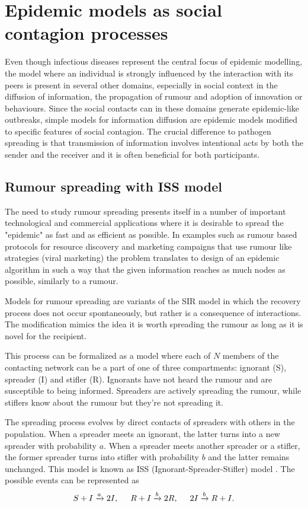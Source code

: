 \documentclass[times, utf8, diplomski]{fer}
\begin{document}
\section{Epidemic models as social contagion processes}
Even though infectious diseases represent the central focus of epidemic modelling, the model where an individual is strongly influenced by the interaction with its peers is present in several other domains, especially in social context in the diffusion of information, the propagation of rumour and adoption of innovation or behaviours.  Since the social contacts can in these domains generate epidemic-like outbreaks, simple models for information diffusion are epidemic models modified to specific features of social contagion. The crucial difference to pathogen spreading is that transmission of information involves intentional acts by both the sender and the receiver and it is often beneficial for both participants.

\subsection{Rumour spreading with ISS model}
The need to study rumour spreading presents itself in a number of important technological and commercial applications where it is desirable to spread the "epidemic" as fast and as efficient as possible.  In examples such as rumour based protocols for resource discovery and marketing campaigns that use rumour like strategies (viral marketing)  the problem translates to design of an epidemic algorithm in such a way that the given information reaches as much nodes as possible, similarly to a rumour.

Models for rumour spreading are variants of the SIR model in which the recovery process does not occur spontaneously, but rather is a consequence of interactions. The modification mimics the idea it is worth spreading the rumour as long as it is novel for the recipient.

 This process can be formalized as a model where each of  $N$ members of the contacting network can be a part of one of three compartments: ignorant (S), spreader (I) and stifler (R). Ignorants have not heard the rumour and are susceptible to being informed. Spreaders are actively spreading the rumour, while stiflers know about the rumour but they're not  spreading it.
 
The spreading process evolves by direct contacts of spreaders with others in the population. 
When a spreader meets an ignorant, the latter turns into a new spreader with probability $a$. When a spreader meets another spreader or a stifler, the former spreader turns into stifler with probability $b$ and the latter remains unchanged. This model is known as  ISS (Ignorant-Spreader-Stifler) model \cite{Moreno2004}. The possible events can be represented as 
\begin{equation}
S + I \xrightarrow{a} 2I,\hspace{5mm}  R + I \xrightarrow{b} 2R,  \hspace{5mm} 2I \xrightarrow{b} R + I.
\end{equation}
\end{document}
